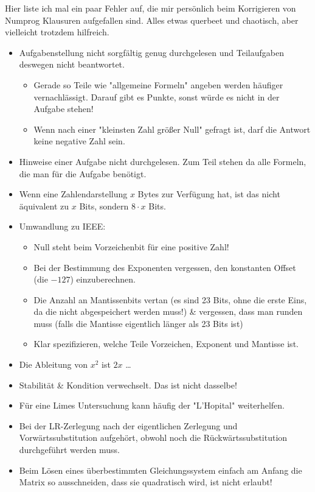 Hier liste ich mal ein paar Fehler auf, die mir persönlich beim Korrigieren von Numprog Klausuren aufgefallen sind. Alles etwas querbeet und chaotisch, aber vielleicht trotzdem hilfreich. \Smiley

\begin{itemize}
	\item Aufgabenstellung nicht sorgfältig genug durchgelesen und Teilaufgaben deswegen nicht beantwortet. 
	\begin{itemize}
		\item Gerade so Teile wie "allgemeine Formeln" angeben werden häufiger vernachlässigt. Darauf gibt es Punkte, sonst würde es nicht in der Aufgabe stehen!
		\item Wenn nach einer "kleinsten Zahl größer Null" gefragt ist, darf die Antwort keine negative Zahl sein.
	\end{itemize}
	\item Hinweise einer Aufgabe nicht durchgelesen. Zum Teil stehen da alle Formeln, die man für die Aufgabe benötigt.
	\item Wenn eine Zahlendarstellung $x$ Bytes zur Verfügung hat, ist das nicht äquivalent zu $x$ Bits, sondern $8 \cdot x$ Bits.
	\item Umwandlung zu IEEE: 
	\begin{itemize}
		\item Null steht beim Vorzeichenbit für eine positive Zahl!
		\item Bei der Bestimmung des Exponenten vergessen, den konstanten Offset (die $-127$) einzuberechnen.
		\item Die Anzahl an Mantissenbits vertan (es sind 23 Bits, ohne die erste Eins, da die nicht abgespeichert werden muss!) \& vergessen, dass man runden muss (falls die Mantisse eigentlich länger als 23 Bits ist)
		\item Klar spezifizieren, welche Teile Vorzeichen, Exponent und Mantisse ist.
	\end{itemize}
	\item Die Ableitung von $x^2$ ist $2x$ \dots
	\item Stabilität \& Kondition verwechselt. Das ist nicht dasselbe!
	\item Für eine Limes Untersuchung kann häufig der "L'Hopital" weiterhelfen.
	\item Bei der LR-Zerlegung nach der eigentlichen Zerlegung und Vorwärtssubstitution aufgehört, obwohl noch die Rückwärtssubstitution durchgeführt werden muss.
	\item Beim Lösen eines überbestimmten Gleichungssystem einfach am Anfang die Matrix so ausschneiden, dass sie quadratisch wird, ist nicht erlaubt!

\end{itemize}

